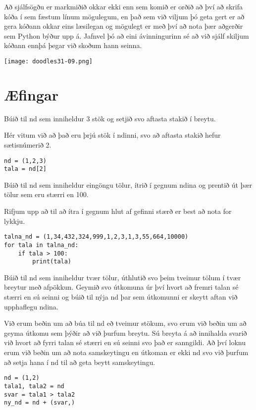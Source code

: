 Að sjálfsögðu er markmiðið okkar ekki enn sem komið er orðið að því að skrifa kóða í sem fæstum línum mögulegum, en það sem við viljum þó geta gert er að gera kóðann okkar eins læsilegan og mögulegt er með því að nota þær aðgerðir sem Python býður upp á.
Jafnvel þó að eini ávinningurinn sé að við sjálf skiljum kóðann ennþá þegar við skoðum hann seinna.

\begin{center}
	\texttt{[image: doodles31-09.png]}
\end{center}

\newpage
\section{Æfingar}
\begin{exercise}\label{nd1}
Búið til nd sem inniheldur 3 stök og setjið svo aftasta stakið í breytu.
\end{exercise}
\begin{Answer}[ref={nd1}]
Hér vitum við að það eru þrjú stök í ndinni, svo að aftasta stakið hefur sætisnúmerið 2.
\begin{lstlisting}
nd = (1,2,3)
tala = nd[2]\end{lstlisting}
\end{Answer}

\begin{exercise}\label{nd2}
Búið til nd sem inniheldur eingöngu tölur, ítrið í gegnum ndina og prentið út þær tölur sem eru stærri en 100.
\end{exercise}
\begin{Answer}[ref={nd2}]
Rifjum upp að til að ítra í gegnum hlut af gefinni stærð er best að nota for lykkju.
\begin{lstlisting}
talna_nd = (1,34,432,324,999,1,2,3,1,3,55,664,10000)
for tala in talna_nd:
	if tala > 100:
		print(tala)\end{lstlisting}
\end{Answer}

\begin{exercise}\label{nd3}
Búið til nd sem inniheldur tvær tölur, úthlutið svo þeim tveimur tölum í tvær breytur með afpökkun.
Geymið svo útkomuna úr því hvort að fremri talan sé stærri en sú seinni og búið til nýja nd þar sem útkomunni er skeytt aftan við upphaflegu ndina.
\end{exercise}
\begin{Answer}[ref={nd3}]
Við erum beðin um að búa til nd eð tveimur stökum, svo erum við beðin um að geyma útkomu sem þýðir að við þurfum breytu.
Sú breyta á að innihalda svarið við hvort að fyrri talan sé stærri en sú seinni svo það er sanngildi.
Að því loknu erum við beðin um að nota samskeytingu en útkoman er ekki nd svo við þurfum að setja hana í nd til að geta beytt samskeytingu.
	\begin{lstlisting}
nd = (1,2)
tala1, tala2 = nd
svar = tala1 > tala2
ny_nd = nd + (svar,)\end{lstlisting}
\end{Answer}

